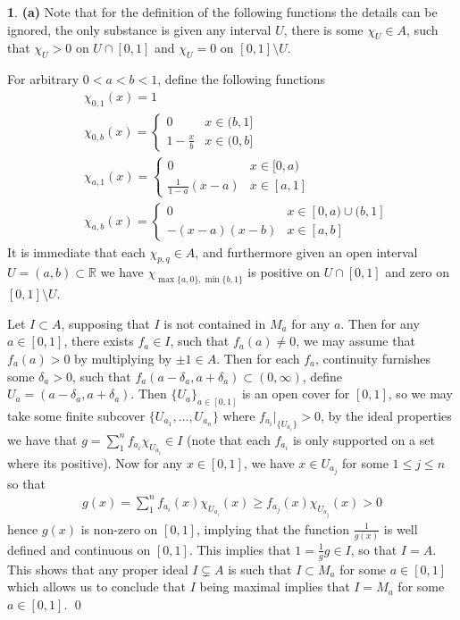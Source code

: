 \documentclass[11pt]{article}
\theoremstyle{definition}
\newtheorem{pb}{}
\newcommand{\set}[1]{\{#1\}}
\begin{document}
    \begin{pb}
        \textbf{(a)} Note that for the definition of the following functions the details can be ignored, the only substance is given any interval \(U\), there is some \(\chi_U \in A\), such that \(\chi_U > 0\) on \(U \cap[0,1]\) and \(\chi_U = 0\) on \([0,1] \setminus U\).
        
        For arbitrary \(0 < a < b < 1\), define the following functions
        \begin{align*}
            &\chi_{0,1}(x) = 1 \\
            &\chi_{0,b}(x) = \begin{cases}
                0 & x \in (b,1] \\
                1 - \frac{x}{b} & x \in (0,b]
            \end{cases} \\
            &\chi_{a,1}(x) = \begin{cases}
                0 & x \in [0,a) \\
                \frac{1}{1-a}(x-a) & x \in [a,1]
            \end{cases} \\
            &\chi_{a,b}(x) = \begin{cases}
                0 & x \in [0,a) \cup (b,1] \\
                -(x-a)(x-b) & x\in [a,b]
            \end{cases}
        \end{align*}
        It is immediate that each \(\chi_{p,q} \in A\), and furthermore given an open interval \(U = (a,b) \subset \mathbb{R}\) we have \(\chi_{\max\set{a,0},\min\set{b,1}}\) is positive on \(U \cap [0,1]\) and zero on \([0,1]\setminus U\).

        Let \(I \subset A\), supposing that \(I\) is not contained in \(M_a\) for any \(a\). Then for any \(a \in [0,1]\), there exists \(f_a \in I\), such that \(f_a(a) \neq 0\), we may assume that \(f_a(a) > 0\) by multiplying by \(\pm1 \in A\). Then for each \(f_a\), continuity furnishes some \(\delta_a > 0\), such that \(f_a(a-\delta_a,a+\delta_a) \subset (0,\infty)\), define \(U_a = (a - \delta_a,a+\delta_a)\). Then \(\set{U_a}_{a\in[0,1]}\) is an open cover for \([0,1]\), so we may take some finite subcover \(\set{U_{a_1},\hdots,U_{a_n}}\) where \(f_{a_i}\vert_{\set{U_{a_i}}} > 0\), by the ideal properties we have that \(g = \sum_1^nf_{a_i}\chi_{U_{a_i}} \in I\) (note that each \(f_{a_i}\) is only supported on a set where its positive). Now for any \(x \in [0,1]\), we have \(x \in U_{a_j}\) for some \(1 \leq j \leq n\) so that
        \begin{align*}
            g(x) = \sum_1^nf_{a_i}(x)\chi_{U_{a_i}}(x) \geq f_{a_j}(x)\chi_{U_{a_j}}(x) > 0
        \end{align*}
        hence \(g(x)\) is non-zero on \([0,1]\), implying that the function \(\frac{1}{g(x)}\) is well defined and continuous on \([0,1]\). This implies that \(1 = \frac{1}{g}g \in I\), so that \(I = A\). This shows that any proper ideal \(I \subsetneq A\) is such that \(I \subset M_a\) for some \(a \in [0,1]\) which allows us to conclude that \(I\) being maximal implies that \(I = M_a\) for some \(a \in [0,1]\). \qed


\end{pb}
\end{document}
